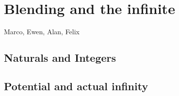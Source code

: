 \section{Blending and the infinite}
\label{sec:infinity}

Marco, Ewen, Alan, Felix

\subsection{Naturals and Integers}

\subsection{Potential and actual infinity}


